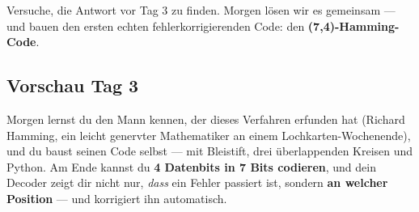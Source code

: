 Versuche, die Antwort vor Tag 3 zu finden. Morgen lösen wir es
gemeinsam — und bauen den ersten echten fehlerkorrigierenden Code:
den \textbf{(7,4)-Hamming-Code}.

\subsection*{Vorschau Tag 3}

Morgen lernst du den Mann kennen, der dieses Verfahren erfunden hat
(Richard Hamming, ein leicht genervter Mathematiker an einem
Lochkarten-Wochenende), und du baust seinen Code selbst — mit
Bleistift, drei überlappenden Kreisen und Python. Am Ende kannst du
\textbf{4 Datenbits in 7 Bits codieren}, und dein Decoder zeigt dir
nicht nur, \emph{dass} ein Fehler passiert ist, sondern \textbf{an
welcher Position} — und korrigiert ihn automatisch.


